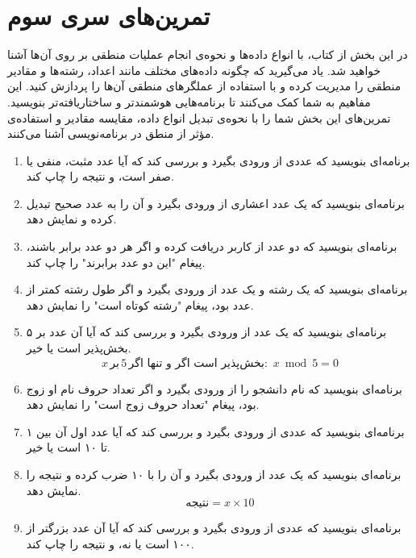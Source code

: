 \documentclass[b5paper,12pt]{article}
\begin{document}
	\newpage
	\section*{تمرین‌های سری سوم}
	در این بخش از کتاب، با انواع داده‌ها و نحوه‌ی انجام عملیات منطقی بر روی آن‌ها آشنا خواهید شد. یاد می‌گیرید که چگونه داده‌های مختلف مانند اعداد، رشته‌ها و مقادیر منطقی را مدیریت کرده و با استفاده از عملگرهای منطقی آن‌ها را پردازش کنید. این مفاهیم به شما کمک می‌کنند تا برنامه‌هایی هوشمندتر و ساختاریافته‌تر بنویسید. تمرین‌های این بخش شما را با نحوه‌ی تبدیل انواع داده، مقایسه مقادیر و استفاده‌ی مؤثر از منطق در برنامه‌نویسی آشنا می‌کنند.

	\begin{enumerate}
		\item برنامه‌ای بنویسید که عددی از ورودی بگیرد و بررسی کند که آیا عدد مثبت، منفی یا صفر است، و نتیجه را چاپ کند.
		
		\item برنامه‌ای بنویسید که یک عدد اعشاری از ورودی بگیرد و آن را به عدد صحیح تبدیل کرده و نمایش دهد.
		
		\item برنامه‌ای بنویسید که دو عدد از کاربر دریافت کرده و اگر هر دو عدد برابر باشند، پیغام "این دو عدد برابرند" را چاپ کند.
		
		\item برنامه‌ای بنویسید که یک رشته و یک عدد از ورودی بگیرد و اگر طول رشته کمتر از عدد بود، پیغام "رشته کوتاه است" را نمایش دهد.
		
		\item برنامه‌ای بنویسید که یک عدد از ورودی بگیرد و بررسی کند که آیا آن عدد بر ۵ بخش‌پذیر است یا خیر.
		\[
		x \, \text{بر} \, 5 \, \text{بخش‌پذیر است اگر و تنها اگر: } \, x \bmod 5 = 0
		\]
		
		\item برنامه‌ای بنویسید که نام دانشجو را از ورودی بگیرد و اگر تعداد حروف نام او زوج بود، پیغام "تعداد حروف زوج است" را نمایش دهد.
		
		\item برنامه‌ای بنویسید که عددی از ورودی بگیرد و بررسی کند که آیا عدد اول آن بین ۱ تا ۱۰ است یا خیر.
		
		\item برنامه‌ای بنویسید که یک عدد از ورودی بگیرد و آن را با ۱۰ ضرب کرده و نتیجه را نمایش دهد.
		\[
		\text{نتیجه} = x \times 10
		\]
		
		\item برنامه‌ای بنویسید که عددی از ورودی بگیرد و بررسی کند که آیا آن عدد بزرگتر از ۱۰۰ است یا نه، و نتیجه را چاپ کند.
		

\end{enumerate}
\end{document}
